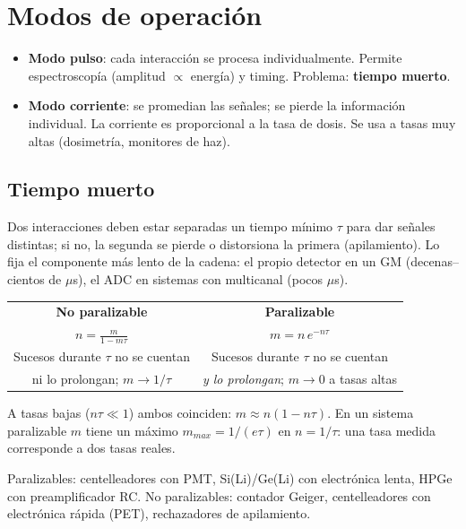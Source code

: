 \section{Modos de operación}
\begin{clave}
\begin{itemize}
\item \textbf{Modo pulso}: cada interacción se procesa individualmente. Permite espectroscopía (amplitud $\propto$ energía) y timing.
Problema: \textbf{tiempo muerto}.
\item \textbf{Modo corriente}: se promedian las señales; se pierde la información individual. La corriente
es proporcional a la tasa de dosis. Se usa a tasas muy altas (dosimetría, monitores de haz).
\end{itemize}
\end{clave}

\subsection{Tiempo muerto}
Dos interacciones deben estar separadas un tiempo mínimo $\tau$ para dar señales distintas; si no, la
segunda se pierde o distorsiona la primera (apilamiento). Lo fija el componente más lento de la cadena:
el propio detector en un GM (decenas--cientos de $\mu$s), el ADC en sistemas con multicanal (pocos $\mu$s).

\begin{clave}
\begin{center}
\begin{tabular}{cc}
\textbf{No paralizable} & \textbf{Paralizable}\\[2pt]
$\displaystyle n=\frac{m}{1-m\tau}$ & $\displaystyle m=n\,e^{-n\tau}$\\[8pt]
Sucesos durante $\tau$ no se cuentan & Sucesos durante $\tau$ no se cuentan\\
ni lo prolongan; $m\to1/\tau$ & \emph{y lo prolongan}; $m\to0$ a tasas altas\\
\end{tabular}
\end{center}
A tasas bajas ($n\tau\ll1$) ambos coinciden: $m\approx n(1-n\tau)$.
En un sistema paralizable $m$ tiene un máximo $m_{max}=1/(e\tau)$ en $n=1/\tau$: una tasa medida corresponde a dos tasas reales.
\end{clave}
\begin{dato}[Ejemplos]
Paralizables: centelleadores con PMT, Si(Li)/Ge(Li) con electrónica lenta, HPGe con preamplificador RC.
No paralizables: contador Geiger, centelleadores con electrónica rápida (PET), rechazadores de apilamiento.
\end{dato}

